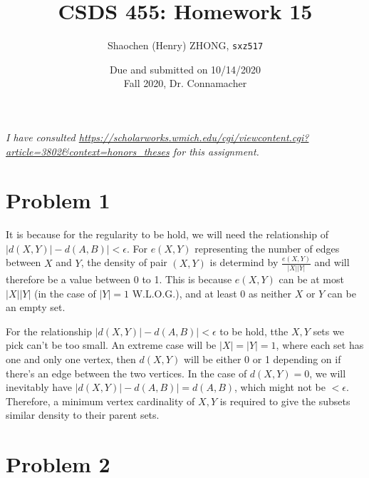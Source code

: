 \documentclass[11pt]{article}
\newcommand{\ilc}{\texttt}
\begin{document}
\title{\textbf{CSDS 455: Homework 15}}

\author{Shaochen (Henry) ZHONG, \ilc{sxz517}}
\date{Due and submitted on 10/14/2020 \\ Fall 2020, Dr. Connamacher}
\maketitle

\textit{I have consulted \url{https://scholarworks.wmich.edu/cgi/viewcontent.cgi?article=3802&context=honors_theses} for this assignment.}

\section*{Problem 1}

It is because for the regularity to be hold, we will need the relationship of $|d(X, Y)| - d(A, B)| < \epsilon$. For $e(X, Y)$ representing the number of edges between $X$ and $Y$, the density of pair $(X, Y)$ is determind by $\frac{e(X, Y)}{|X||Y|}$ and will therefore be a value between 0 to 1. This is because $e(X, Y)$ can be at most $|X||Y|$ (in the case of $|Y| = 1$ W.L.O.G.), and at least $0$ as neither $X$ or $Y$ can be an empty set.

For the relationship $|d(X, Y)| - d(A, B)| < \epsilon$ to be hold, tthe $X, Y$ sets we pick can't be too small. An extreme case will be $|X| = |Y| = 1$, where each set has one and only one vertex, then $d(X, Y)$ will be either 0 or 1 depending on if there's an edge between the two vertices. In the case of $d(X, Y) = 0$, we will inevitably have $|d(X, Y)| - d(A, B)| = d(A, B)$, which might not be $< \epsilon$. Therefore, a minimum vertex cardinality of $X, Y$ is required to give the subsets similar density to their parent sets.


\section*{Problem 2}



%
% 
% 
\end{document}

